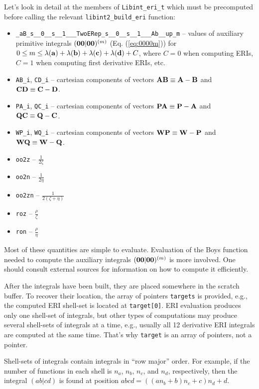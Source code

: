 \documentclass[12pt]{article}
\begin{document}
Let's look in detail at the members of {\tt Libint\_eri\_t} which must be precomputed before
calling the relevant {\tt libint2\_build\_eri} function:
\begin{itemize}
\item {\tt \_aB\_s\_\_0\_\_s\_\_1\_\_\_TwoERep\_s\_\_0\_\_s\_\_1\_\_\_Ab\_\_up\_m} --
values of auxiliary primitive integrals $({\bf 00}|{\bf 00})^{(m)}$ (Eq. (\ref{eq:0000m}))
for $0 \leq m \leq \lambda({\bf a}) + \lambda({\bf b}) + \lambda({\bf c}) + \lambda({\bf d}) + C$,
where $C = 0$ when computing ERIs, $C=1$ when computing first derivative ERIs, etc.
\item {\tt AB\_i}, {\tt CD\_i} -- cartesian components of vectors ${\bf AB} \equiv {\bf A} - {\bf B}$
and ${\bf CD} \equiv {\bf C} - {\bf D}$.
\item {\tt PA\_i}, {\tt QC\_i} -- cartesian components of vectors ${\bf PA} \equiv {\bf P} - {\bf A}$
and ${\bf QC} \equiv {\bf Q} - {\bf C}$.
\item {\tt WP\_i}, {\tt WQ\_i} -- cartesian components of vectors ${\bf WP} \equiv {\bf W} - {\bf P}$
and ${\bf WQ} \equiv {\bf W} - {\bf Q}$.
\item {\tt oo2z} -- $\frac{1}{2\zeta}$
\item {\tt oo2n} -- $\frac{1}{2\eta}$
\item {\tt oo2zn} -- $\frac{1}{2(\zeta+\eta)}$
\item {\tt roz} -- $\frac{\rho}{\zeta}$
\item {\tt ron} -- $\frac{\rho}{\eta}$
\end{itemize}
Most of these quantities are simple to evaluate. Evaluation of the Boys function needed to compute
the auxiliary integrals $({\bf 00}|{\bf 00})^{(m)}$ is more involved.
One should consult external sources for information on how
to compute it efficiently.\cite{Gill91}

After the integrals have been built, they are placed somewhere in the scratch buffer.
To recover their location, the array of pointers {\tt targets} is provided, e.g.,
the computed ERI shell-set is located at {\tt target[0]}.
ERI evaluation produces only one shell-set of integrals, but other types of computations
may produce several shell-sets of integrals at a time, e.g., usually all 12 derivative
ERI integrals are computed at the same time. That's why {\tt target} is an array of pointers, not a pointer.

Shell-sets of integrals contain integrals in ``row major'' order.\cite{KnuthACP} For example, if
the number of functions in each shell is $n_a$, $n_b$, $n_c$, and $n_d$, respectively,
then the integral $(ab|cd)$ is found at position $abcd = ( (a n_b + b) n_c + c) n_d + d$.
\end{document}
